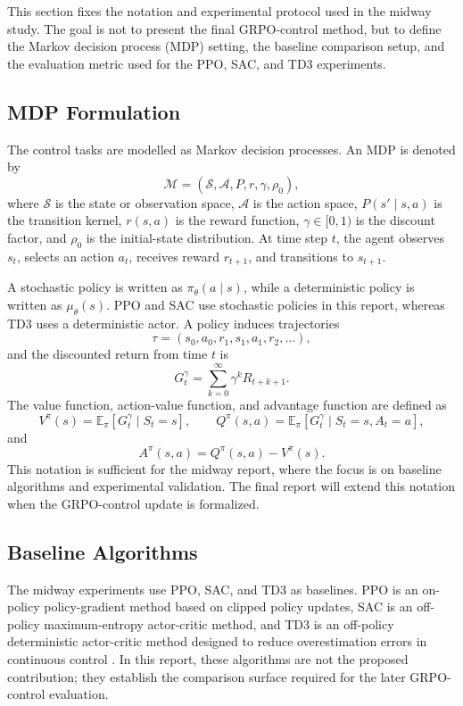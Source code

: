 
\label{sec:methodology}

This section fixes the notation and experimental protocol used in the midway study. The goal is not to present the final GRPO-control method, but to define the Markov decision process (MDP) setting, the baseline comparison setup, and the evaluation metric used for the PPO, SAC, and TD3 experiments.

\subsection{MDP Formulation}
\label{sec:methodology-mdp}

The control tasks are modelled as Markov decision processes. An MDP is denoted by
\[
\mathcal{M} = (\mathcal{S}, \mathcal{A}, P, r, \gamma, \rho_0),
\]
where $\mathcal{S}$ is the state or observation space, $\mathcal{A}$ is the action space, $P(s' \mid s,a)$ is the transition kernel, $r(s,a)$ is the reward function, $\gamma \in [0,1)$ is the discount factor, and $\rho_0$ is the initial-state distribution. At time step $t$, the agent observes $s_t$, selects an action $a_t$, receives reward $r_{t+1}$, and transitions to $s_{t+1}$.

A stochastic policy is written as $\pi_\theta(a \mid s)$, while a deterministic policy is written as $\mu_\theta(s)$. PPO and SAC use stochastic policies in this report, whereas TD3 uses a deterministic actor. A policy induces trajectories
\[
\tau = (s_0,a_0,r_1,s_1,a_1,r_2,\ldots),
\]
and the discounted return from time $t$ is
\[
G_t^\gamma = \sum_{k=0}^{\infty} \gamma^k R_{t+k+1}.
\]
The value function, action-value function, and advantage function are defined as
\[
V^\pi(s)=\mathbb{E}_{\pi}\!\left[G_t^\gamma \mid S_t=s\right],
\qquad
Q^\pi(s,a)=\mathbb{E}_{\pi}\!\left[G_t^\gamma \mid S_t=s,A_t=a\right],
\]
and
\[
A^\pi(s,a)=Q^\pi(s,a)-V^\pi(s).
\]
This notation is sufficient for the midway report, where the focus is on baseline algorithms and experimental validation. The final report will extend this notation when the GRPO-control update is formalized.

\subsection{Baseline Algorithms}
\label{sec:methodology-baselines}

The midway experiments use PPO, SAC, and TD3 as baselines. PPO is an on-policy policy-gradient method based on clipped policy updates, SAC is an off-policy maximum-entropy actor-critic method, and TD3 is an off-policy deterministic actor-critic method designed to reduce overestimation errors in continuous control \citep{schulman2017proximal,haarnoja2018sacapps,fujimoto2018td3}. In this report, these algorithms are not the proposed contribution; they establish the comparison surface required for the later GRPO-control evaluation.

